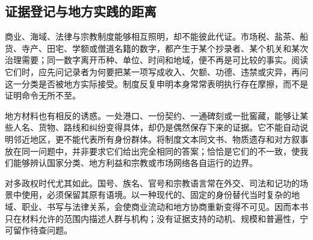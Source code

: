 \subsection{证据登记与地方实践的距离}

商业、海域、法律与宗教制度能够相互照明，却不能彼此代证。市场税、盐茶、船货、寺产、田宅、学额或僧道名籍的数字，都产生于某个抄录者、某个机关和某次治理需要；同一数字离开币种、单位、时间和地域，便不再是可比较的事实。阅读它们时，应先问记录者为何要把某一项写成收入、欠额、功德、违禁或灾异，再问这一分类是否被地方实际接受。制度反复申明本身常常表明执行存在摩擦，而不是证明命令无所不至。

地方材料也有相反的诱惑。一处港口、一份契约、一通碑刻或一批窖藏，能够让某些人名、货物、路线和纠纷变得具体，却仍是偶然保存下来的证据。它不能自动说明邻近地区，更不能代表所有身份群体。将制度文本同文书、物质遗存和对方叙事放在同一问题中，并非要求它们给出完全相同的答案；恰恰是它们的不一致，使我们能够辨认国家分类、地方利益和宗教或市场网络各自运行的边界。

对多政权时代尤其如此。国号、族名、官号和宗教语言常在外交、司法和记功的场景中使用，必须保留其原有语境。以一种现代的、固定的身份替代当时复杂的地域、职业、书写与法律关系，会使商业流动和地方协商重新变得不可见。因而本书只在材料允许的范围内描述人群与机构；没有证据支持的动机、规模和普遍性，宁可留作待查问题。

